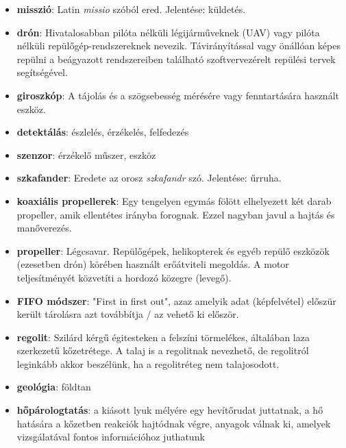 \documentclass[12pt]{report}
\begin{document}
\begin{itemize}

  \item \textbf{misszió}: Latin \textit{missio} szóból ered. Jelentése: küldetés.
  \item \textbf{drón}: Hivatalosabban pilóta nélküli légijárműveknek (UAV) vagy pilóta nélküli repülőgép-rendszereknek nevezik. Távirányítással vagy önállóan képes repülni a beágyazott rendszereiben található szoftvervezérelt repülési tervek segítségével.
  \item \textbf{giroszkóp}: A tájolás és a szögsebesség mérésére vagy fenntartására használt eszköz.
  \item \textbf{detektálás}: észlelés, érzékelés, felfedezés
  \item \textbf{szenzor}: érzékelő műszer, eszköz
  \item \textbf{szkafander}: Eredete az orosz \textit{szkafandr} szó. Jelentése: űrruha.
  \item \textbf{koaxiális propellerek}: Egy tengelyen egymás fölött elhelyezett két darab propeller, amik ellentétes irányba forognak. Ezzel nagyban javul a hajtás és manőverezés.
  \item \textbf{propeller}: Légcsavar. Repülőgépek, helikopterek és egyéb repülő eszközök (ezesetben drón) körében használt erőátviteli megoldás. A motor teljesítményét közvetíti a hordozó közegre (levegő).
  \item \textbf{FIFO módszer}: "First in first out", azaz amelyik adat (képfelvétel) előszür került tárolásra azt továbbítja / az vehető ki először.
  \item \textbf{regolit}: Szilárd kérgű égitesteken a felszíni törmelékes, általában laza szerkezetű kőzetrétege. A talaj is a regolitnak nevezhető, de regolitról leginkább akkor beszélünk, ha a regolitréteg nem talajosodott.
  \item \textbf{geológia}: földtan
  \item \textbf{hőpárologtatás}: a kiásott lyuk mélyére egy hevítőrudat juttatnak, a hő hatására a kőzetben reakciók hajtódnak végre, anyagok válnak ki, amelyek vizsgálatával fontos információhoz juthatunk

\end{itemize}
\end{document}

